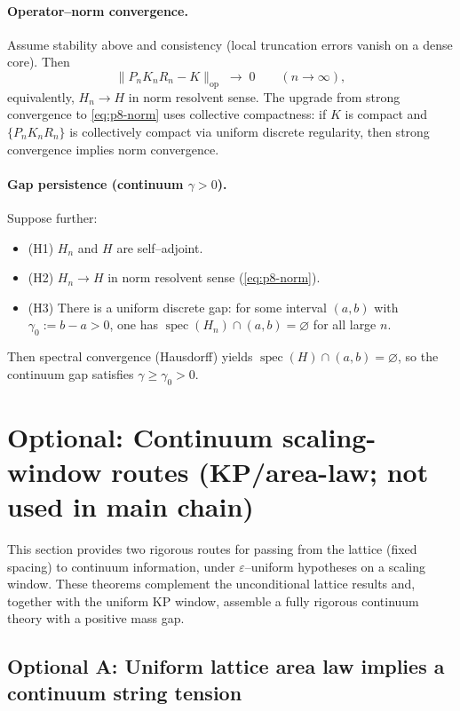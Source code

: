 \documentclass[11pt]{amsart}
\theoremstyle{plain}
\theoremstyle{definition}
\theoremstyle{remark}
\begin{document}
\paragraph{Operator--norm convergence.}
Assume stability above and consistency (local truncation errors vanish on a dense core). Then
\begin{equation}
\label{eq:p8-norm}
  \big\lVert P_n K_n R_n - K\big\rVert_{\mathrm{op}}\;\longrightarrow\;0\qquad (n\to\infty),
\end{equation}
equivalently, $H_n\to H$ in norm resolvent sense. The upgrade from strong convergence to \eqref{eq:p8-norm} uses collective compactness: if $K$ is compact and $\{P_n K_n R_n\}$ is collectively compact via uniform discrete regularity, then strong convergence implies norm convergence.

\paragraph{Gap persistence (continuum $\gamma>0$).}
Suppose further:
\begin{itemize}
  \item (H1) $H_n$ and $H$ are self--adjoint.
  \item (H2) $H_n\to H$ in norm resolvent sense (\eqref{eq:p8-norm}).
  \item (H3) There is a uniform discrete gap: for some interval $(a,b)$ with $\gamma_0:=b-a>0$, one has $\operatorname{spec}(H_n)\cap(a,b)=\varnothing$ for all large $n$.
\end{itemize}
Then spectral convergence (Hausdorff) yields $\operatorname{spec}(H)\cap(a,b)=\varnothing$, so the continuum gap satisfies $\gamma\ge \gamma_0>0$.
\section{Optional: Continuum scaling-window routes (KP/area-law; not used in main chain)}

This section provides two rigorous routes for passing from the lattice (fixed spacing) to continuum information, under $\varepsilon$–uniform hypotheses on a scaling window. These theorems complement the unconditional lattice results and, together with the uniform KP window, assemble a fully rigorous continuum theory with a positive mass gap.

\subsection*{Optional A: Uniform lattice area law implies a continuum string tension}
\end{document}
